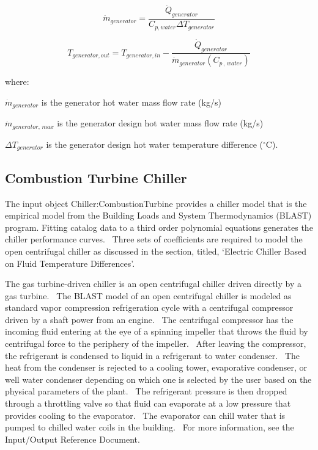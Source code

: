 \begin{equation}
  \dot{m}_{generator} = \frac{\dot{Q}_{generator}}{C_{p,water}\Delta T_{generator}}
\end{equation}

\begin{equation}
{T_{generator,out}} = {T_{generator,in}} - \frac{{{{\dot Q}_{generator}}}}{{{{\dot m}_{generator}}\left( {{C_{p\,,\,water}}} \right)}}
\end{equation}

where:

\({\dot m_{generator}}\) is the generator hot water mass flow rate (kg/s)

\({\dot m_{generator,\,max}}\) is the generator design hot water mass flow rate (kg/s)

\(\Delta {T_{generator}}\) is the generator design hot water temperature difference (\(^{\circ}\)C).

\subsection{Combustion Turbine Chiller}\label{combustion-turbine-chiller}

The input object Chiller:CombustionTurbine provides a chiller model that is the empirical model from the Building Loads and System Thermodynamics (BLAST) program. Fitting catalog data to a third order polynomial equations generates the chiller performance curves.~ Three sets of coefficients are required to model the open centrifugal chiller as discussed in the section, titled, `Electric Chiller Based on Fluid Temperature Differences'.

The gas turbine-driven chiller is an open centrifugal chiller driven directly by a gas turbine.~ The BLAST model of an open centrifugal chiller is modeled as standard vapor compression refrigeration cycle with a centrifugal compressor driven by a shaft power from an engine.~ The centrifugal compressor has the incoming fluid entering at the eye of a spinning impeller that throws the fluid by centrifugal force to the periphery of the impeller.~ After leaving the compressor, the refrigerant is condensed to liquid in a refrigerant to water condenser.~ The heat from the condenser is rejected to a cooling tower, evaporative condenser, or well water condenser depending on which one is selected by the user based on the physical parameters of the plant.~ The refrigerant pressure is then dropped through a throttling valve so that fluid can evaporate at a low pressure that provides cooling to the evaporator.~ The evaporator can chill water that is pumped to chilled water coils in the building.~ For more information, see the Input/Output Reference Document.

